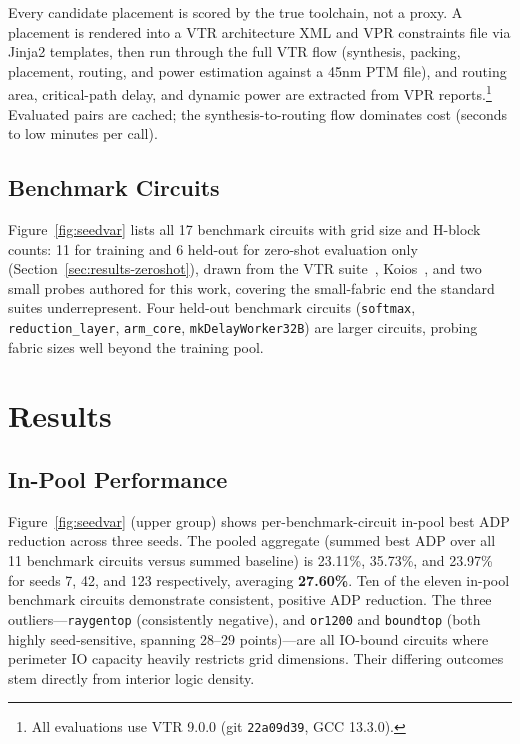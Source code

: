 \documentclass[sigconf]{acmart}
\begin{document}
Every candidate placement is scored by the true toolchain, not a proxy.
A placement is rendered into a VTR architecture XML and VPR constraints
file via Jinja2 templates, then run through the full VTR flow (synthesis,
packing, placement, routing, and power estimation against a 45nm PTM file),
and routing area, critical-path delay, and dynamic power are extracted
from VPR reports.\footnote{All evaluations use VTR 9.0.0 (git
\texttt{22a09d39}, GCC 13.3.0).} Evaluated pairs are cached; the
synthesis-to-routing flow dominates cost (seconds to low minutes per call).

\subsection{Benchmark Circuits}
\label{sec:benchmarks}

Figure~\ref{fig:seedvar} lists all 17 benchmark circuits with grid size and
H-block counts: 11 for training and 6 held-out for zero-shot evaluation
only (Section~\ref{sec:results-zeroshot}), drawn from the VTR suite~\cite{vtr8},
Koios~\cite{koios}, and two small probes authored for this work, covering the
small-fabric end the standard suites underrepresent. Four held-out
benchmark circuits (\texttt{softmax}, \texttt{reduction\_layer}, \texttt{arm\_core},
\texttt{mkDelayWorker32B}) are larger circuits, probing fabric sizes well
beyond the training pool.



\section{Results}
\label{sec:results}

\subsection{In-Pool Performance}
\label{sec:results-inpool}

Figure~\ref{fig:seedvar} (upper group) shows per-benchmark-circuit in-pool best ADP
reduction across three seeds. The pooled aggregate (summed best ADP over all 11
benchmark circuits versus summed baseline) is 23.11\%, 35.73\%, and 23.97\% for
seeds 7, 42, and 123 respectively, averaging \textbf{27.60\%}. Ten of the eleven in-pool benchmark circuits demonstrate consistent, positive ADP reduction. The three outliers---\texttt{raygentop} (consistently negative), and \texttt{or1200} and \texttt{boundtop} (both highly seed-sensitive, spanning 28--29 points)---are all IO-bound circuits where perimeter IO capacity heavily restricts grid dimensions. Their differing outcomes stem directly from interior logic density.
\end{document}
